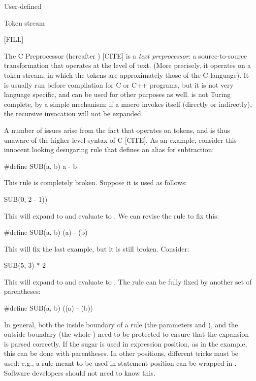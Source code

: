  User-defined

 Token stream

 [FILL]

The C Preprocessor (hereafter ) [CITE] is a \emph{text
  preprocessor}: a source-to-source transformation that operates at
the level of text. (More precisely, it operates on a token stream, in
which the tokens are approximately those of the C language). It is
usually run before compilation for C or C++ programs, but it is not
very language specific, and can be used for other purposes as well.
 is not Turing complete, by a simple mechanism: if a macro
invokes itself (directly or indirectly), the recursive invocation
will not be expanded.

A number of issues arise from the fact that  operates on tokens, and
is thus unaware of the higher-level syntax of C [CITE].
As an example, consider this innocent looking
 desugaring rule that defines an alias for subtraction:
\begin{Codes}
  #define SUB(a, b) a - b
\end{Codes}
This rule is completely broken. Suppose it is used as follows:
\begin{Codes}
  SUB(0, 2 - 1))
\end{Codes}
This will expand to  and evaluate to .
We can revise the rule to fix this:
\begin{Codes}
  #define SUB(a, b) (a) - (b)
\end{Codes}
This will fix the last example, but it is still broken. Consider:
\begin{Codes}
  SUB(5, 3) * 2
\end{Codes}
This will expand to  and evaluate to .
The rule can be fully fixed by another set of parentheses:
\begin{Codes}
  #define SUB(a, b) ((a) - (b))
\end{Codes}
In general, both the inside boundary of a rule (the parameters 
and ), and the outside boundary (the whole ) need
to be protected to ensure that the expansion is parsed correctly. If
the sugar is used in expression position, as in the 
example, this can be done with parentheses. In other positions,
different tricks must be used: e.g., a rule meant to be used in
statement position can be wrapped in .
Software developers should not need to know this. %

